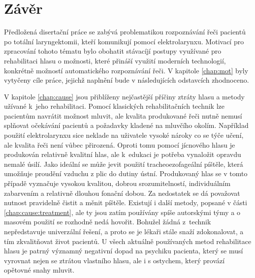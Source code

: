 \chapter*{Závěr}
\label{chap:conclusion}

Předložená disertační práce se zabývá problematikou rozpoznávání řeči pacientů po totální laryngektomii, kteří komunikují pomocí elektrolarynxu. Motivací pro zpracování tohoto tématu bylo obohatit stávacíjí postupy využívané pro rehabilitaci hlasu o možnosti, které přináší využití moderních technologií, konkrétně možností automatického rozpoznávání řeči. V kapitole \ref{chap:mot} byly vytyčeny cíle práce, jejichž naplnění bude v následujících odstavcích zhodnoceno.

V kapitole \ref{chap:cause} jsou přiblíženy nejčastější příčiny ztráty hlasu a metody užívané k~jeho rehabilitaci.
Pomocí klasických rehabilitačních technik lze pacientům navrátit možnost mluvit, ale kvalita produkované řeči nutně nemusí splňovat očekávání pacientů  a požadavky kladené na mluvčího okolím. Například použití
elektrolarynxu sice neklade na uživatele vysoké nároky co se týče učení, ale
kvalita řeči není vůbec přirozená. Oproti tomu pomocí jícnového hlasu je
produkován relativně kvalitní hlas, ale k~edukaci je potřeba vynaložit opravdu
nemalé úsilí. Jako ideální se může jevit použití tracheoezofageální píštěle,
která umožňuje proudění vzduchu z plic do dutiny ústní. Produkovaný hlas se v
tomto případě vyznačuje vysokou kvalitou, dobrou srozumitelností,
individuálním zabarvením a relativně dlouhou fonační dobou. Za nedostatek se
dá považovat nutnost pravidelně čistit a měnit píštěle. Existují i další
metody, popsané v části \ref{chap:cause:treatment}, ale ty jsou zatím používány
spíše autorskými týmy a o masovém použití se rozhodně nedá hovořit. Bohužel
žádná z~technik nepředstavuje univerzální řešení, a proto se je lékaři
stále snaží zdokonalovat, a tím zkvalitňovat život pacientů. U všech aktuálně používaných metod rehabilitace hlasu
je patrný významný negativní dopad na psychiku pacienta, který se musí vyrovnat nejen se ztrátou vlastního hlasu, ale i s ostychem, který provází opětovné snahy mluvit.

